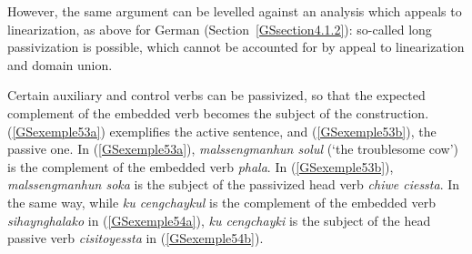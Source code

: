 \documentclass[output=paper
                ,modfonts
                ,nonflat
	        ,collection
	        ,collectionchapter
	        ,collectiontoclongg
 	        ,biblatex
                ,babelshorthands
                ,newtxmath
                ,draftmode
                ,colorlinks, citecolor=brown
]{./langsci/langscibook}
\begin{document}
{\begin{exe}
    \label{GSexemple52}
\end{exe}

However, the same argument can be levelled against an analysis which appeals to linearization, as above for German (Section~\ref{GSsection4.1.2}): so-called long passivization is possible, which cannot be accounted for by appeal to linearization and domain union.

Certain auxiliary and control verbs can be passivized, so that the expected complement of the embedded verb becomes the subject of the construction. (\ref{GSexemple53a}) exemplifies the active sentence, and (\ref{GSexemple53b}), the passive one. In (\ref{GSexemple53a}), \emph{malssengmanhun solul} (`the troublesome cow’) is the complement of the embedded verb \emph{phala}. In (\ref{GSexemple53b}), \emph{malssengmanhun soka} is the subject of the passivized head verb \emph{chiwe ciessta}. In the same way, while \emph{ku cengchaykul} is the complement of the embedded verb \emph{sihaynghalako} in (\ref{GSexemple54a}), \emph{ku cengchayki} is the subject of the head passive verb \emph{cisitoyessta} in (\ref{GSexemple54b}).  

\eal
	\label{GSexemple53} 
	\label{GSexemple53a}
		
	\label{GSexemple53b}
\zl


}
\end{document}
